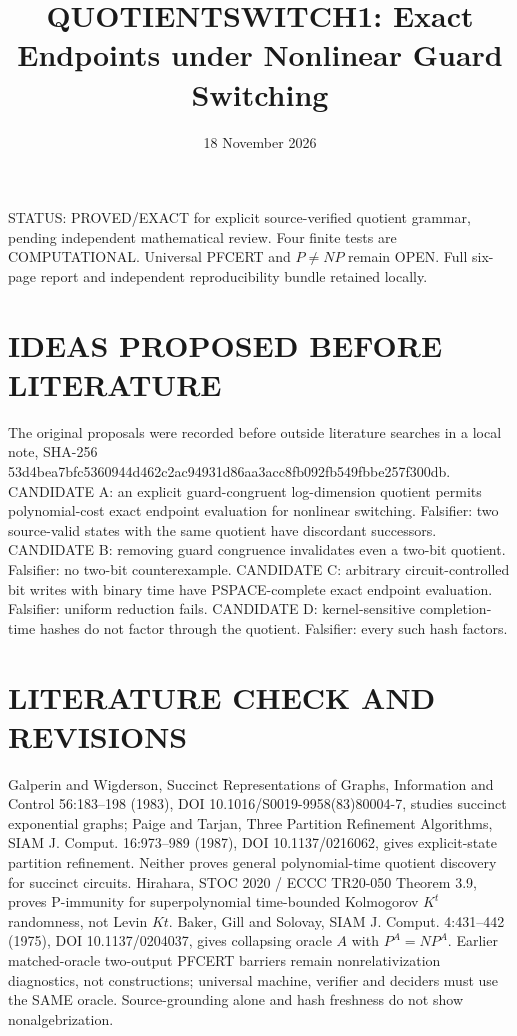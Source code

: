 \documentclass[11pt]{article}
\title{QUOTIENTSWITCH1: Exact Endpoints under Nonlinear Guard Switching}
\date{18 November 2026}
\begin{document}
\maketitle
\noindent STATUS: PROVED/EXACT for explicit source-verified quotient grammar, pending independent mathematical review. Four finite tests are COMPUTATIONAL. Universal PFCERT and $P\ne NP$ remain OPEN. Full six-page report and independent reproducibility bundle retained locally.

\section{IDEAS PROPOSED BEFORE LITERATURE}
The original proposals were recorded before outside literature searches in a local note, SHA-256 53d4bea7bfc5360944d462c2ac94931d86aa3acc8fb092fb549fbbe257f300db. CANDIDATE A: an explicit guard-congruent log-dimension quotient permits polynomial-cost exact endpoint evaluation for nonlinear switching. Falsifier: two source-valid states with the same quotient have discordant successors. CANDIDATE B: removing guard congruence invalidates even a two-bit quotient. Falsifier: no two-bit counterexample. CANDIDATE C: arbitrary circuit-controlled bit writes with binary time have PSPACE-complete exact endpoint evaluation. Falsifier: uniform reduction fails. CANDIDATE D: kernel-sensitive completion-time hashes do not factor through the quotient. Falsifier: every such hash factors.

\section{LITERATURE CHECK AND REVISIONS}
Galperin and Wigderson, Succinct Representations of Graphs, Information and Control 56:183--198 (1983), DOI 10.1016/S0019-9958(83)80004-7, studies succinct exponential graphs; Paige and Tarjan, Three Partition Refinement Algorithms, SIAM J. Comput. 16:973--989 (1987), DOI 10.1137/0216062, gives explicit-state partition refinement. Neither proves general polynomial-time quotient discovery for succinct circuits. Hirahara, STOC 2020 / ECCC TR20-050 Theorem 3.9, proves P-immunity for superpolynomial time-bounded Kolmogorov $K^t$ randomness, not Levin $Kt$. Baker, Gill and Solovay, SIAM J. Comput. 4:431--442 (1975), DOI 10.1137/0204037, gives collapsing oracle $A$ with $P^A=NP^A$. Earlier matched-oracle two-output PFCERT barriers remain nonrelativization diagnostics, not constructions; universal machine, verifier and deciders must use the SAME oracle. Source-grounding alone and hash freshness do not show nonalgebrization.
\end{document}
